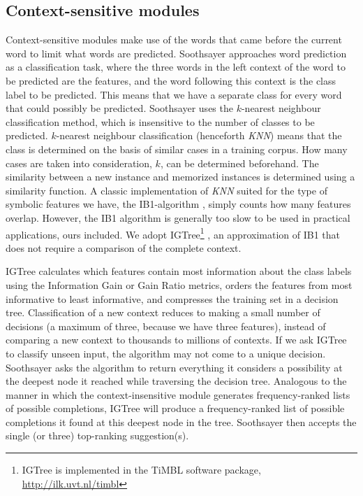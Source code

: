 \documentclass[12pt]{article}
\begin{document}
\subsection{Context-sensitive modules} \label{cs}

Context-sensitive modules make use of the words that came before the current word to limit what words are predicted. Soothsayer approaches word prediction as a classification task, where the three words in the left context of the word to be predicted are the features, and the word following this context is the class label to be predicted. This means that we have a separate class for every word that could possibly be predicted. Soothsayer uses the $k$-nearest neighbour classification method, which is insensitive to the number of classes to be predicted. $k$-nearest neighbour classification (henceforth \emph{KNN}) means that the class is determined on the basis of similar cases in a training corpus. How many cases are taken into consideration, $k$, can be determined beforehand. The similarity between a new instance and memorized instances is determined using a similarity function.  A classic implementation of \emph{KNN} suited for the type of symbolic features we have, the IB1-algorithm \cite{aha+91}, simply counts how many features overlap. However, the IB1 algorithm is generally too slow to be used in practical applications, ours included. We adopt IGTree\footnote{IGTree is implemented in the TiMBL software package, \url{http://ilk.uvt.nl/timbl}} \cite{daelemans+97}, an approximation of IB1 that does not require a comparison of the complete context.

IGTree calculates which features contain most information about the class labels using the Information Gain or Gain Ratio metrics, orders the features from most informative to least informative, and compresses the training set in a decision tree. Classification of a new context reduces to making a small number of decisions (a maximum of three, because we have three features), instead of comparing a new context to thousands to millions of contexts. If we ask IGTree to classify unseen input, the algorithm may not come to a unique decision. Soothsayer asks the algorithm to return everything it considers a possibility at the deepest node it reached while traversing the decision tree. Analogous to the manner in which the context-insensitive module generates frequency-ranked lists of possible completions, IGTree will produce a frequency-ranked list of possible completions it found at this deepest node in the tree. Soothsayer then accepts the single (or three) top-ranking suggestion(s).
\end{document}
